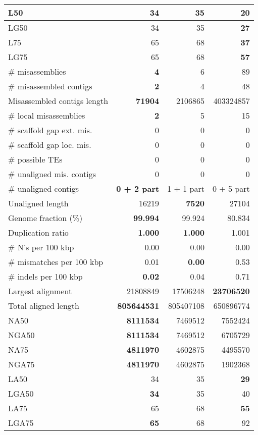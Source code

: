 \documentclass[12pt,a4paper]{article}
\begin{document}
\begin{table}[ht]
\begin{center}
\begin{tabular}{|l*{3}{|r}|}
L50 & 34 & 35 & {\bf 20} \\ \hline
LG50 & 34 & 35 & {\bf 27} \\ \hline
L75 & 65 & 68 & {\bf 37} \\ \hline
LG75 & 65 & 68 & {\bf 57} \\ \hline
\# misassemblies & {\bf 4} & 6 & 89 \\ \hline
\# misassembled contigs & {\bf 2} & 4 & 48 \\ \hline
Misassembled contigs length & {\bf 71904} & 2106865 & 403324857 \\ \hline
\# local misassemblies & {\bf 2} & 5 & 15 \\ \hline
\# scaffold gap ext. mis. & 0 & 0 & 0 \\ \hline
\# scaffold gap loc. mis. & 0 & 0 & 0 \\ \hline
\# possible TEs & 0 & 0 & 0 \\ \hline
\# unaligned mis. contigs & 0 & 0 & 0 \\ \hline
\# unaligned contigs & {\bf 0 + 2 part} & 1 + 1 part & 0 + 5 part \\ \hline
Unaligned length & 16219 & {\bf 7520} & 27104 \\ \hline
Genome fraction (\%) & {\bf 99.994} & 99.924 & 80.834 \\ \hline
Duplication ratio & {\bf 1.000} & {\bf 1.000} & 1.001 \\ \hline
\# N's per 100 kbp & 0.00 & 0.00 & 0.00 \\ \hline
\# mismatches per 100 kbp & 0.01 & {\bf 0.00} & 0.53 \\ \hline
\# indels per 100 kbp & {\bf 0.02} & 0.04 & 0.71 \\ \hline
Largest alignment & 21808849 & 17506248 & {\bf 23706520} \\ \hline
Total aligned length & {\bf 805644531} & 805407108 & 650896774 \\ \hline
NA50 & {\bf 8111534} & 7469512 & 7552424 \\ \hline
NGA50 & {\bf 8111534} & 7469512 & 6705729 \\ \hline
NA75 & {\bf 4811970} & 4602875 & 4495570 \\ \hline
NGA75 & {\bf 4811970} & 4602875 & 1902368 \\ \hline
LA50 & 34 & 35 & {\bf 29} \\ \hline
LGA50 & {\bf 34} & 35 & 40 \\ \hline
LA75 & 65 & 68 & {\bf 55} \\ \hline
LGA75 & {\bf 65} & 68 & 92 \\ \hline
\end{tabular}
\end{center}
\end{table}
\end{document}
